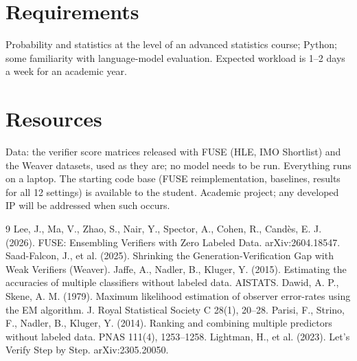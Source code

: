 \documentclass[11pt]{article}
\begin{document}
\section*{Requirements}

Probability and statistics at the level of an advanced statistics course; Python; some
familiarity with language-model evaluation. Expected workload is 1--2 days a week for an
academic year.

\section*{Resources}

Data: the verifier score matrices released with FUSE (HLE, IMO Shortlist) and the Weaver
datasets, used as they are; no model needs to be run. Everything runs on a laptop. The
starting code base (FUSE reimplementation, baselines, results for all 12 settings) is
available to the student. Academic project; any developed IP will be addressed when such
occurs.

\begin{thebibliography}{9}\small
{} Lee, J., Ma, V., Zhao, S., Nair, Y., Spector, A., Cohen, R., Cand\`es, E. J. (2026). FUSE: Ensembling Verifiers with Zero Labeled Data. arXiv:2604.18547.
 Saad-Falcon, J., et al. (2025). Shrinking the Generation-Verification Gap with Weak Verifiers (Weaver).
 Jaffe, A., Nadler, B., Kluger, Y. (2015). Estimating the accuracies of multiple classifiers without labeled data. AISTATS.
 Dawid, A. P., Skene, A. M. (1979). Maximum likelihood estimation of observer error-rates using the EM algorithm. J. Royal Statistical Society C 28(1), 20--28.
 Parisi, F., Strino, F., Nadler, B., Kluger, Y. (2014). Ranking and combining multiple predictors without labeled data. PNAS 111(4), 1253--1258.
 Lightman, H., et al. (2023). Let's Verify Step by Step. arXiv:2305.20050.
\end{thebibliography}
\end{document}
